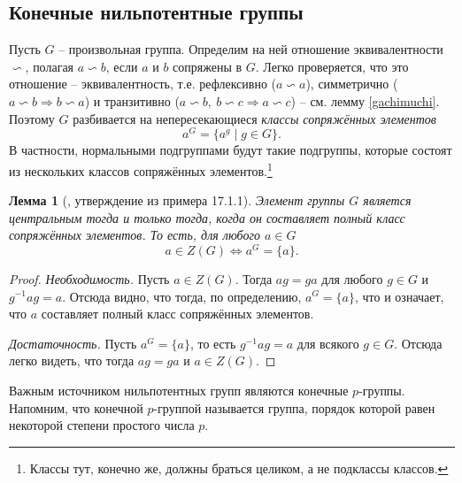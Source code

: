 \documentclass{article}
\newtheorem{lemma}{Лемма}[section]
\begin{document}
\subsection{Конечные нильпотентные группы}

Пусть $G$ -- произвольная группа. Определим на ней отношение эквивалентности $\backsim$, полагая $a \backsim b$, если $a$ и $b$ сопряжены в $G$. Легко проверяется, что это отношение -- эквивалентность, т.е. рефлексивно ($a \backsim a$), симметрично ($a \backsim b \Rightarrow b \backsim a$) и транзитивно ($a \backsim b, \ b \backsim c \Rightarrow a \backsim c$) -- см. лемму \ref{gachimuchi}. Поэтому $G$ разбивается на непересекающиеся \textit{классы сопряжённых элементов} $$ a^G = \{ a^g \mid g \in G \}. $$
В частности, нормальными подгруппами будут такие подгруппы, которые состоят из нескольких классов сопряжённых элементов.\footnote{Классы тут, конечно же, должны браться целиком, а не подклассы классов.}

\begin{lemma}[\cite{kargapolov}, утверждение из примера 17.1.1] \label{ferio}
    Элемент группы $G$ является центральным тогда и только тогда, когда он составляет полный класс сопряжённых элементов. То есть, для любого $a \in G$
    \[
        a \in Z(G) \Leftrightarrow a^G = \{a\}.
    \]
\end{lemma}
\begin{proof}
    \textit{Необходимость.} Пусть $a \in Z(G)$. Тогда $ag = ga$ для любого $g \in G$ и $g^{-1} a g = a$. Отсюда видно, что тогда, по определению, $a^G = \{ a \}$, что и означает, что $a$ составляет полный класс сопряжённых элементов.
    
    \textit{Достаточность.} Пусть $a^G = \{ a \}$, то есть $g^{-1} a g = a$ для всякого $g \in G$. Отсюда легко видеть, что тогда $a g = g a$ и $a \in Z(G)$.
\end{proof}

Важным источником нильпотентных групп являются конечные $p$-группы. Напомним, что конечной $p$-группой называется группа, порядок которой равен некоторой степени простого числа $p$.
\end{document}
